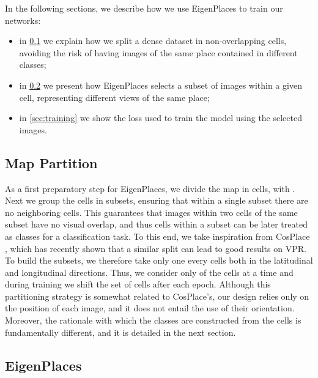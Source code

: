 \documentclass[10pt,twocolumn,letterpaper]{article}
\newcommand\our{EigenPlaces}
\begin{document}
In the following sections, we describe how we use EigenPlaces to train our networks:
\begin{itemize}[noitemsep,topsep=1pt]
    \item in \cref{sec:dataset_partitioning} we explain how we split a dense dataset in non-overlapping cells, avoiding the risk of having images of the same place contained in different classes;
    \item in \cref{sec:eigenplaces} we present how EigenPlaces selects a subset of images within a given cell, representing different views of the same place;
    \item in \cref{sec:training} we show the loss used to train the model using the selected images.
\end{itemize}




\subsection{Map Partition}
\label{sec:dataset_partitioning}
As a first preparatory step for {\our}, we divide the map in  cells, with .
Next we group the cells in subsets, ensuring that within a single subset there are no neighboring cells. This guarantees that images within two cells of the same subset have no visual overlap, and thus cells within a subset can be later treated as classes for a classification task.
To this end, we take inspiration from CosPlace \cite{Berton_2022_cosPlace}, which has recently shown that a similar split can lead to good results on VPR.
To build the subsets, we therefore take only one every  cells both in the latitudinal and longitudinal directions.
Thus, we consider only  of the cells at a time and during training we shift the set of cells after each epoch.
Although this partitioning strategy is somewhat related to CosPlace's, our design relies only on the position of each image, and it does not entail the use of their orientation. Moreover, the rationale with which the classes are constructed from the cells is fundamentally different, and it is detailed in the next section.



\subsection{EigenPlaces}
\label{sec:eigenplaces}
\end{document}
